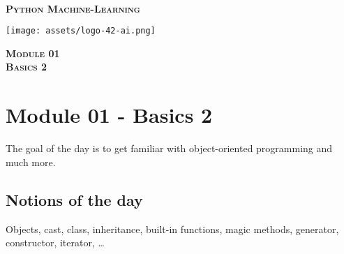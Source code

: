 \documentclass[]{article}
\date{}
\begin{document}

\vspace*{2cm}
\begin{center}
    \textsc{\fontsize{40}{48} \bfseries }\\[0.6cm]
    \textsc{\fontsize{39}{48} \bfseries { %
Python Machine-Learning
    }}\\[0.3cm]
\end{center}
\vspace{3cm}

\begin{center}
\texttt{[image: assets/logo-42-ai.png]}{\centering}
\end{center}

\vspace*{2cm}
\begin{center}
    \textsc{\fontsize{32}{48} \bfseries %
Module 01    
    }\\[0.6cm]
    \textsc{\fontsize{32}{48} \bfseries %
Basics 2    
    }\\[0.3cm]
\end{center}
\vspace{3cm}

\newpage

\setcounter{page}{1}



\hypertarget{module-01---basics-2}{%
\section{Module 01 - Basics 2}\label{module-01---basics-2}}

The goal of the day is to get familiar with object-oriented programming
and much more.

\hypertarget{notions-of-the-day}{%
\subsection{Notions of the day}\label{notions-of-the-day}}

Objects, cast, class, inheritance, built-in functions, magic methods,
generator, constructor, iterator, \ldots{}
\end{document}
